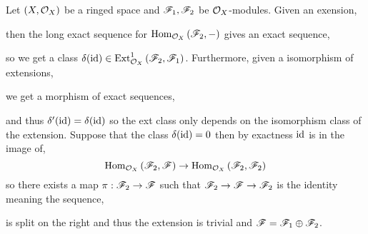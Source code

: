 \documentclass[12pt]{article}
\begin{document}
Let $(X, \mathcal{O}_{X})$ be a ringed space and $\mathscr{F}_1, \mathscr{F}_2$ be $\mathcal{O}_{X}$-modules. Given an exension,
\begin{center}
\end{center}
then the long exact sequence for $\mathrm{Hom}_{\mathcal{O}_{X}} \left( \mathscr{F}_2, - \right)$ gives an exact sequence,
\begin{center}
\end{center}
so we get a class $\delta(\mathrm{id}) \in \mathrm{Ext}^{1}_{\mathcal{O}_{X}} \left( \mathscr{F}_2, \mathscr{F}_1 \right)$. Furthermore, given a isomorphism of extensions,
\begin{center}
\end{center}
we get a morphism of exact sequences,
\begin{center}
\end{center}
and thus $\delta'(\mathrm{id}) = \delta(\mathrm{id})$ so the ext class only depends on the isomorphism class of the extension. Suppose that the class $\delta(\mathrm{id}) = 0$ then by exactness $\mathrm{id}$ is in the image of,
\[ \mathrm{Hom}_{\mathcal{O}_{X}} \left( \mathscr{F}_2, \mathscr{F} \right) \to \mathrm{Hom}_{\mathcal{O}_{X}} \left( \mathscr{F}_2, \mathscr{F}_2 \right) \]
so there exists a map $\pi : \mathscr{F}_2 \to \mathscr{F}$ such that $\mathscr{F}_2 \to \mathscr{F} \to \mathscr{F}_2$ is the identity meaning the sequence,
\begin{center}
\end{center}
is split on the right and thus the extension is trivial and $\mathscr{F} = \mathscr{F}_1 \oplus \mathscr{F}_2$.
\end{document}
